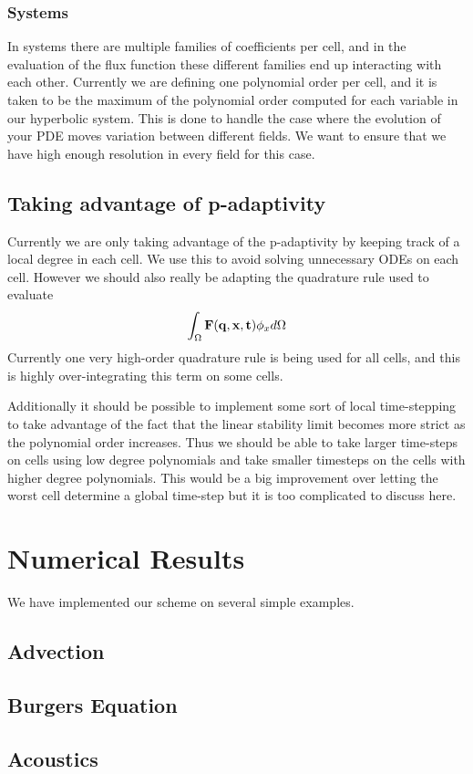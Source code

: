 \documentclass[10]{amsart}
\begin{document}
\subsubsection{Systems}
In systems there are multiple families of coefficients per cell, and in the evaluation of the 
flux function these different families end up interacting with each other. Currently we are defining
one polynomial order per cell, and it is taken to be the maximum of the polynomial order computed for each variable
in our hyperbolic system. This is done to handle the case where the evolution of your PDE moves variation between different
fields. We want to ensure that we have high enough resolution in every field for this case. 

\subsection{Taking advantage of p-adaptivity}
Currently we are only taking advantage of the p-adaptivity by keeping track
of a local degree in each cell. We use this to avoid solving unnecessary ODEs
on each cell. However we should also really be adapting the quadrature rule used to evaluate
$$\int_{\Omega}{\bf F(q,x,t)} \phi_x d\Omega$$
Currently one very high-order quadrature rule is being used for all cells, and this
is highly over-integrating this term on some cells. 

Additionally it should be possible to implement some sort of local time-stepping to take
advantage of the fact that the linear stability limit becomes more strict as the polynomial order increases.
Thus we should be able to take larger time-steps on cells using low degree polynomials
and take smaller timesteps on the cells with higher degree polynomials. This would be a big improvement
over letting the worst cell determine a global time-step but it is too complicated to discuss here.

\section{Numerical Results}

We have implemented our scheme on several simple examples. 

\subsection{Advection}

\subsection{Burgers Equation}

\subsection{Acoustics}





\end{document}
